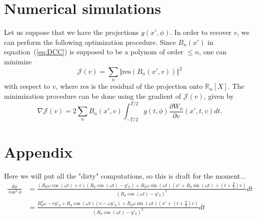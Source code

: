 \documentclass[a4paper]{article}
\numberwithin{equation}{section}
\newcommand{\R}{\mathbb{R}}
\begin{document}
\section{Numerical simulations}

Let us suppose that we have the projections $g(x',\phi)$. In order to recover $v$, we can perform the following optimization procedure. Since $B_n(x')$ in equation~(\ref{eq:DCC}) is supposed to be a polynom of order $\leq n$, one can minimize
\begin{equation}
	\mathcal{J}(v) = \sum_n \Vert \textrm{res} \left( B_n(x',v) \right) \Vert^2
\end{equation}
with respect to $v$, where $\textrm{res}$ is the residual of the projection onto $\R_n[X]$. The minimization procedure can be done using the gradient of $\mathcal{J}(v)$, given by
\begin{equation}
	\nabla \mathcal{J}(v) = 2 \sum_n B_n(x',v) \int_{-T/2}^{T/2} g(t,\phi) \frac{\partial W_n}{\partial v}(x',t,v) dt.
\end{equation}




\section{Appendix}

Here we will put all the "dirty" computations, so this is draft for the moment...
\begin{align}
\frac{d\phi}{\cos^2 \phi} &= \frac{ \left( R_0 \omega \cos(\omega t) +v \right) \left( R_0 \cos(\omega t) - y'_0 \right) + R_0 \omega \sin(\omega t) \left( x' + R_0 \sin(\omega t) + \left( t + \frac{T}{2} \right)v \right) }{ \left( R_0 \cos(\omega t) - y'_0 \right)^2 } dt \\
 &= \frac{ R_0^2 \omega - v y'_0 + R_0 \cos(\omega t)(v-\omega y'_0) + R_0 \omega \sin(\omega t)(x' + \left( t + \frac{T}{2} \right)v ) }{ \left( R_0 \cos(\omega t) - y'_0 \right)^2 } dt\\
\end{align}
\end{document}
